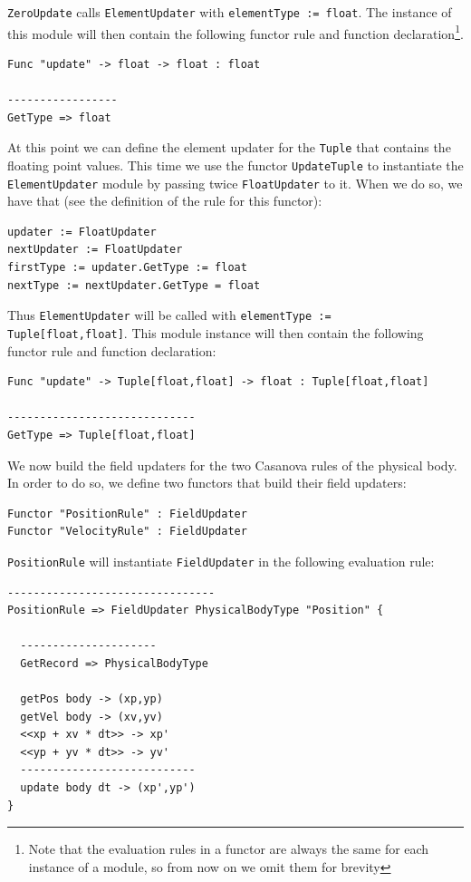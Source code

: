 \noindent
\texttt{ZeroUpdate} calls \texttt{ElementUpdater} with \texttt{elementType := float}. The instance of this module will then contain the following functor rule and function declaration\footnote{Note that the evaluation rules in a functor are always the same for each instance of a module, so from now on we omit them for brevity}.

\begin{lstlisting}
Func "update" -> float -> float : float

-----------------
GetType => float
\end{lstlisting}

\noindent
At this point we can define the element updater for the \texttt{Tuple} that contains the floating point values. This time we use the functor \texttt{UpdateTuple} to instantiate the \texttt{ElementUpdater} module by passing twice \texttt{FloatUpdater} to it. When we do so, we have that (see the definition of the rule for this functor):

\begin{lstlisting}
updater := FloatUpdater
nextUpdater := FloatUpdater
firstType := updater.GetType := float
nextType := nextUpdater.GetType = float
\end{lstlisting}

\noindent
Thus \texttt{ElementUpdater} will be called with \texttt{elementType := \\Tuple[float,float]}. This module instance will then contain the following functor rule and function declaration:

\begin{lstlisting}
Func "update" -> Tuple[float,float] -> float : Tuple[float,float]

-----------------------------
GetType => Tuple[float,float]
\end{lstlisting}

\noindent
We now build the field updaters for the two Casanova rules of the physical body. In order to do so, we define two functors that build their field updaters:

\begin{lstlisting}
Functor "PositionRule" : FieldUpdater
Functor "VelocityRule" : FieldUpdater
\end{lstlisting}

\noindent
\texttt{PositionRule} will instantiate \texttt{FieldUpdater} in the following evaluation rule:

\begin{lstlisting}
--------------------------------
PositionRule => FieldUpdater PhysicalBodyType "Position" {

  ---------------------
  GetRecord => PhysicalBodyType

  getPos body -> (xp,yp)
  getVel body -> (xv,yv)
  <<xp + xv * dt>> -> xp'
  <<yp + yv * dt>> -> yv'
  ---------------------------
  update body dt -> (xp',yp')
}
\end{lstlisting}

